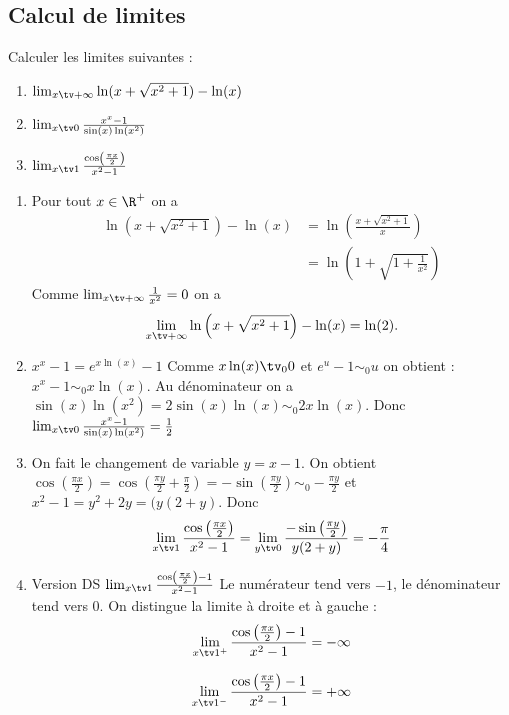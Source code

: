 \subsection{Calcul de limites}

\begin{exercice}
Calculer les limites suivantes : 

\begin{enumerate}
\item $\lim_{x\tv+\infty} \ln(x+\sqrt{x^2 +1}) -\ln(x)$\\

\item $\lim_{x\tv 0} \frac{x^x-1}{\sin(x)\ln(x^2)}$
\item $\lim_{x\tv 1} \frac{\cos\left(\frac{\pi x}{2}\right)}{x^2-1}$
\end{enumerate}
\end{exercice}



\begin{correction}
\begin{enumerate}

\item  Pour tout $x\in \R^+$ on a 
\begin{align*}
 \ln\left(x+\sqrt{x^2+1}\right) -\ln(x)  
							&= \ln\left(\frac{x+\sqrt{x^2+1}}{x}\right)  \\
							&= \ln\left(1+\sqrt{1+\frac{1}{x^2}}\right)  
\end{align*}
Comme $\lim_{x\tv+\infty} \frac{1}{x^2}=0$ on a 
$$\lim_{x\tv+\infty} \ln\left(x+\sqrt{x^2+1}\right) -\ln(x)  =\ln(2).$$

\item $x^x-1 = e^{x\ln(x) }-1 $ Comme $x\ln(x)\tv_0 0 $ et $e^u-1 \sim_0 u$  on obtient : $x^x-1 \sim_0 x\ln(x)$.
Au dénominateur on a  $\sin(x )\ln(x^2) =2\sin(x)\ln(x) \sim_0 2x \ln(x)$. 
Donc $\lim_{x\tv 0} \frac{x^x-1}{\sin(x)\ln(x^2)} = \frac{1}{2}$

\item On fait le changement de variable $y=x-1$. On obtient 
$\cos\left(\frac{\pi x}{2}\right) = \cos\left( \frac{\pi y}{2} +\frac{\pi}{2} \right) = -\sin\left(\frac{\pi y}{2}\right)\sim_0 -\frac{\pi y}{2}$
et $x^2 - 1 = y^2 +2y=(y(2+y) $. Donc 
$$\lim_{x\tv 1} \frac{\cos\left(\frac{\pi x}{2}\right) }{x^2-1}= \lim_{y\tv 0} \frac{ -\sin\left(\frac{\pi y}{2}\right)}{y(2+y)} = -\frac{\pi }{4}$$


\item Version DS $\lim_{x\tv 1} \frac{\cos\left(\frac{\pi x}{2}\right) - 1}{x^2-1}$
Le numérateur tend vers $-1$, le dénominateur tend vers $0$. On distingue la limite à droite et à gauche : 
$$\lim_{x\tv 1^+} \frac{\cos\left(\frac{\pi x}{2}\right) - 1}{x^2-1}= -\infty$$

$$\lim_{x\tv 1^-} \frac{\cos\left(\frac{\pi x}{2}\right) - 1}{x^2-1}= +\infty$$


\end{enumerate}
\end{correction}